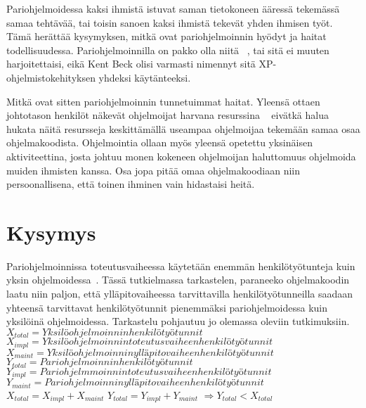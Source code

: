 \documentclass[finnish]{tktltiki2}
\theoremstyle{definition}
\theoremstyle{remark}
\begin{document}
Pariohjelmoidessa kaksi ihmistä istuvat saman tietokoneen ääressä tekemässä samaa tehtävää, tai toisin sanoen kaksi ihmistä tekevät yhden ihmisen työt. Tämä herättää kysymyksen, mitkä ovat pariohjelmoinnin hyödyt ja haitat todellisuudessa. Pariohjelmoinnilla on pakko olla niitä  ~\cite{costandbenefit}, tai sitä ei muuten harjoitettaisi, eikä Kent Beck olisi varmasti nimennyt sitä XP-ohjelmistokehityksen yhdeksi käytänteeksi.

Mitkä ovat sitten pariohjelmoinnin tunnetuimmat haitat. Yleensä ottaen johtotason henkilöt näkevät ohjelmoijat harvana resurssina ~\cite{costandbenefit2} eivätkä halua hukata näitä resursseja keskittämällä useampaa ohjelmoijaa tekemään samaa osaa ohjelmakoodista. Ohjelmointia ollaan myös yleensä opetettu yksinäisen aktiviteettina, josta johtuu monen kokeneen ohjelmoijan haluttomuus ohjelmoida muiden ihmisten kanssa. Osa jopa pitää omaa ohjelmakoodiaan niin persoonallisena, että toinen ihminen vain hidastaisi heitä.


\section{Kysymys}

Pariohjelmoinnissa toteutusvaiheessa käytetään enemmän henkilötyötunteja kuin yksin ohjelmoidessa~\cite{costandbenefit2}. Tässä tutkielmassa tarkastelen, paraneeko ohjelmakoodin laatu niin paljon, että ylläpitovaiheessa tarvittavilla henkilötyötunneilla saadaan yhteensä tarvittavat henkilötyötunnit pienemmäksi pariohjelmoidessa kuin yksilöinä ohjelmoidessa. Tarkastelu pohjautuu jo olemassa oleviin tutkimuksiin.\newline\newline
$X_{total} = Yksilöohjelmoinnin henkilötyötunnit $\newline
$X_{impl} = Yksilöohjelmoinnin toteutusvaiheen henkilötyötunnit $\newline
$X_{maint} = Yksilöohjelmoinnin ylläpitovaiheen henkilötyötunnit $\newline
$Y_{total} = Pariohjelmoinnin henkilötyötunnit $\newline
$Y_{impl} = Pariohjelmmoinnin toteutusvaiheen henkilötyötunnit $\newline
$Y_{maint} = Pariohjelmoinnin ylläpitovaiheen henkilötyötunnit $\newline
$X_{total} = X_{impl} + X_{maint} $\newline
$Y_{total} = Y_{impl} + Y_{maint} $\newline
$\Rightarrow Y_{total} < X_{total}$ \newline
\end{document}
